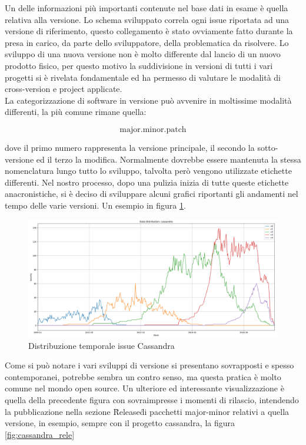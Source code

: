 \documentclass[%
    corpo=12pt,
    twoside,
    oldstyle,
    autoretitolo,
    greek,
    evenboxes,
]{toptesi}
\begin{document}
Un delle informazioni più importanti contenute nel base dati in esame è quella relativa alla versione. Lo schema sviluppato correla ogni issue riportata ad una versione di riferimento, questo collegamento è stato ovviamente fatto durante la presa in carico, da parte dello sviluppatore, della problematica da risolvere. Lo sviluppo di una nuova versione non è molto differente dal lancio di un nuovo prodotto fisico, per questo motivo la suddivisione in versioni di tutti i vari progetti si è rivelata fondamentale ed ha permesso di valutare le modalità di cross-version e project applicate.\\
La categorizzazione di software in versione può avvenire in moltissime modalità differenti, la più comune rimane quella:
\begin{center}
  \begin{equation}
    \textrm{major}.\textrm{minor}.\textrm{patch}
  \end{equation}
\end{center}
dove il primo numero rappresenta la versione principale, il secondo la sotto-versione ed il terzo la modifica. Normalmente dovrebbe essere mantenuta la stessa nomenclatura lungo tutto lo sviluppo, talvolta però vengono utilizzate etichette differenti. Nel nostro processo, dopo una pulizia inizia di tutte queste etichette anacronistiche, si è deciso di sviluppare alcuni grafici riportanti gli andamenti nel tempo delle varie versioni. Un esempio in figura \ref{fig:cassandra_vers1}.
\begin{figure}[!ht]
  \includegraphics[width=\linewidth]{figure/cassandra_vers.png}
  \caption{Distribuzione temporale issue Cassandra}
  \label{fig:cassandra_vers1}
\end{figure}
Come si può notare i vari sviluppi di versione si presentano sovrapposti e spesso contemporanei, potrebbe sembra un contro senso, ma questa pratica è molto comune nel mondo open source. Un ulteriore ed interessante visualizzazione è quella della precedente figura con sovraimpresse i momenti di rilascio, intendendo la pubblicazione nella sezione \"Release\" di pacchetti major-minor relativi a quella versione, in esempio, sempre con il progetto cassandra, la figura \ref{fig:cassandra_rele} 
\end{document}
